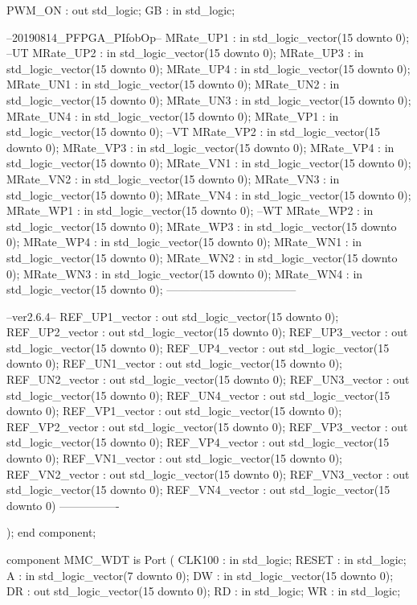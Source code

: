 \begin{mylisting}[language=VHDL,caption=トップモジュール,label=appF_Top_module_VHDL]
			PWM_ON		: out	std_logic;
			GB			: in	std_logic;
			
			--20190814_PFPGA_PIfobOp--
			MRate_UP1	: in	std_logic_vector(15 downto 0);		--UT
			MRate_UP2	: in	std_logic_vector(15 downto 0);
			MRate_UP3	: in	std_logic_vector(15 downto 0);
			MRate_UP4	: in	std_logic_vector(15 downto 0);
			MRate_UN1	: in	std_logic_vector(15 downto 0);
			MRate_UN2	: in	std_logic_vector(15 downto 0);
			MRate_UN3	: in	std_logic_vector(15 downto 0);
			MRate_UN4	: in	std_logic_vector(15 downto 0);
			MRate_VP1	: in	std_logic_vector(15 downto 0);		--VT
			MRate_VP2	: in	std_logic_vector(15 downto 0);
			MRate_VP3	: in	std_logic_vector(15 downto 0);
			MRate_VP4	: in	std_logic_vector(15 downto 0);
			MRate_VN1	: in	std_logic_vector(15 downto 0);
			MRate_VN2	: in	std_logic_vector(15 downto 0);
			MRate_VN3	: in	std_logic_vector(15 downto 0);
			MRate_VN4	: in	std_logic_vector(15 downto 0);
			MRate_WP1	: in	std_logic_vector(15 downto 0);		--WT
			MRate_WP2	: in	std_logic_vector(15 downto 0);
			MRate_WP3	: in	std_logic_vector(15 downto 0);
			MRate_WP4	: in	std_logic_vector(15 downto 0);
			MRate_WN1	: in	std_logic_vector(15 downto 0);
			MRate_WN2	: in	std_logic_vector(15 downto 0);
			MRate_WN3	: in	std_logic_vector(15 downto 0);
			MRate_WN4	: in	std_logic_vector(15 downto 0);
			-----------------------------------
			
			--ver2.6.4--
			REF_UP1_vector	: out std_logic_vector(15 downto 0);
			REF_UP2_vector	: out std_logic_vector(15 downto 0);
			REF_UP3_vector	: out std_logic_vector(15 downto 0);
			REF_UP4_vector	: out std_logic_vector(15 downto 0);
			REF_UN1_vector	: out std_logic_vector(15 downto 0);
			REF_UN2_vector	: out std_logic_vector(15 downto 0);
			REF_UN3_vector	: out std_logic_vector(15 downto 0);
			REF_UN4_vector	: out std_logic_vector(15 downto 0);
			REF_VP1_vector	: out std_logic_vector(15 downto 0);
			REF_VP2_vector	: out std_logic_vector(15 downto 0);
			REF_VP3_vector	: out std_logic_vector(15 downto 0);
			REF_VP4_vector	: out std_logic_vector(15 downto 0);
			REF_VN1_vector	: out std_logic_vector(15 downto 0);
			REF_VN2_vector	: out std_logic_vector(15 downto 0);
			REF_VN3_vector	: out std_logic_vector(15 downto 0);
			REF_VN4_vector	: out std_logic_vector(15 downto 0)
			----------------
		
			);
	end component;


	component MMC_WDT is
		Port (
			CLK100		: in	std_logic;
			RESET		: in	std_logic;
			A			: in	std_logic_vector(7 downto 0);
			DW			: in	std_logic_vector(15 downto 0);
			DR			: out	std_logic_vector(15 downto 0);
			RD			: in	std_logic;
			WR			: in	std_logic;
			

\end{mylisting}

